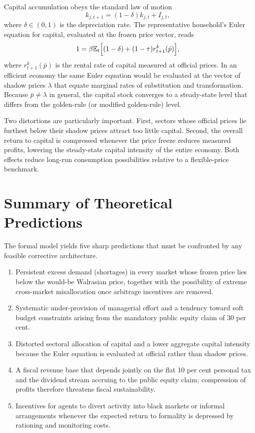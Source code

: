 \documentclass[12pt,anyside]{book}
\theoremstyle{definition}
\theoremstyle{plain}
\theoremstyle{remark}
\begin{document}
Capital accumulation obeys the standard law of motion
\begin{equation}
k_{j,t+1}=(1-\delta)k_{j,t}+I_{j,t},
\end{equation}
where $\delta\in(0,1)$ is the depreciation rate. The representative household’s Euler equation for capital, evaluated at the frozen price vector, reads
\begin{equation}
1=\beta\mathbb{E}_t\Bigl[(1-\delta)+(1-\tau)r_{t+1}^k(\bar{p})\Bigr],
\end{equation}
where $r_{t+1}^k(\bar{p})$ is the rental rate of capital measured at official prices. In an efficient economy the same Euler equation would be evaluated at the vector of shadow prices $\lambda$ that equate marginal rates of substitution and transformation. Because $\bar{p}\neq\lambda$ in general, the capital stock converges to a steady-state level that differs from the golden-rule (or modified golden-rule) level.

Two distortions are particularly important. First, sectors whose official prices lie furthest below their shadow prices attract too little capital. Second, the overall return to capital is compressed whenever the price freeze reduces measured profits, lowering the steady-state capital intensity of the entire economy. Both effects reduce long-run consumption possibilities relative to a flexible-price benchmark.

\section{Summary of Theoretical Predictions}

The formal model yields five sharp predictions that must be confronted by any feasible corrective architecture.

\begin{enumerate}[label=\arabic*)]
\item Persistent excess demand (shortages) in every market whose frozen price lies below the would-be Walrasian price, together with the possibility of extreme cross-market misallocation once arbitrage incentives are removed.
\item Systematic under-provision of managerial effort and a tendency toward soft budget constraints arising from the mandatory public equity claim of 30 per cent.
\item Distorted sectoral allocation of capital and a lower aggregate capital intensity because the Euler equation is evaluated at official rather than shadow prices.
\item A fiscal revenue base that depends jointly on the flat 10 per cent personal tax and the dividend stream accruing to the public equity claim; compression of profits therefore threatens fiscal sustainability.
\item Incentives for agents to divert activity into black markets or informal arrangements whenever the expected return to formality is depressed by rationing and monitoring costs.
\end{enumerate}
\end{document}

